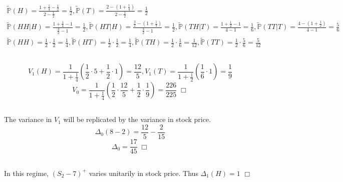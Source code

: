 \documentclass{article}
\begin{document}
\section{}
\subsection{}
\begin{gather*}
\widetilde{\mathbb{P}}(H) = \frac{1 + \frac{1}{4} - \frac{1}{2}}{2 - \frac{1}{2}} = \frac{1}{2}, \widetilde{\mathbb{P}}(T) = \frac{2 - (1 + \frac{1}{4})}{2 - \frac{1}{2}} = \frac{1}{2}\\
\widetilde{\mathbb{P}}(HH | H) = \frac{1 + \frac{1}{4} - 1}{\frac{3}{2} - 1} = \frac{1}{2}, \widetilde{\mathbb{P}}(HT | H) = \frac{\frac{3}{2} - (1 + \frac{1}{4})}{\frac{3}{2} - 1} = \frac{1}{2}, \widetilde{\mathbb{P}}(TH | T) = \frac{1 + \frac{1}{2} - 1}{4 - 1} = \frac{1}{6}, \widetilde{\mathbb{P}}(TT | T) = \frac{4 - (1 + \frac{1}{2})}{4 - 1} = \frac{5}{6}\\
\widetilde{\mathbb{P}}(HH) = \frac{1}{2} \cdot \frac{1}{2} = \frac{1}{4}, \widetilde{\mathbb{P}}(HT) = \frac{1}{2} \cdot \frac{1}{2} = \frac{1}{4}, \widetilde{\mathbb{P}}(TH) = \frac{1}{2} \cdot \frac{1}{6} = \frac{1}{12}, \widetilde{\mathbb{P}}(TT) = \frac{1}{2} \cdot \frac{5}{6} = \frac{5}{12}
\end{gather*}

\subsection{}
$$V_1(H) = \frac{1}{1 + \frac{1}{4}} \left( \frac{1}{2} \cdot 5 + \frac{1}{2} \cdot 1 \right) = \frac{12}{5}, V_1(T) = \frac{1}{1 + \frac{1}{2}} \left( \frac{1}{6} \cdot 1 \right) = \frac{1}{9}$$
$$V_0 = \frac{1}{1 + \frac{1}{4}} \left( \frac{1}{2} \cdot \frac{12}{5} + \frac{1}{2} \cdot \frac{1}{9} \right) = \frac{226}{225}  \; \Box$$

\subsection{}
The variance in $V_1$ will be replicated by the variance in stock price.
$$\Delta_0 (8 - 2) = \frac{12}{5} - \frac{2}{15}$$
$$\Delta_0 = \frac{17}{45} \; \Box$$

\subsection{}
In this regime, $(S_2 - 7)^+$ varies unitarily in stock price. Thus $\Delta_1(H) = 1$ $\Box$
\end{document}
